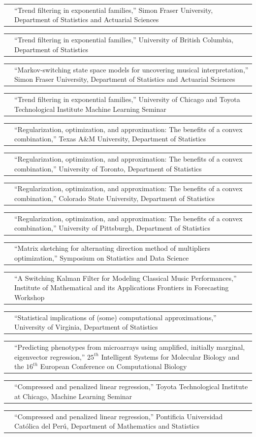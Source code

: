 \documentclass[11pt,letterpaper]{minimal/moderncv}
\makeatletter
\renewcommand*{\cvitem}[2]{%
  \begin{tabular}{@{}p{\hintscolumnwidth}@{\hspace{\separatorcolumnwidth}}%
    p{\maincolumnwidth}@{}}%
    \raggedleft {#1} &  {#2}%
  \end{tabular}%
}
\makeatother
\begin{document}
\cvitem{}{``Trend filtering in exponential families,'' Simon
  Fraser University, Department of Statistics and Actuarial Sciences}


\cvitem{}{``Trend filtering in exponential families,'' University
  of British Columbia, Department of Statistics}

\cvitem{2019}{``Markov-switching state space models for uncovering
  musical interpretation,'' Simon Fraser University, Department of
  Statistics and Actuarial Sciences}

\cvitem{}{ ``Trend filtering in exponential families,'' University of
  Chicago and Toyota Technological Institute Machine Learning
  Seminar}

\cvitem{}{ ``Regularization, optimization, and approximation: The benefits
  of a convex combination,'' Texas A\&M University, Department of
  Statistics }

\cvitem{}{ ``Regularization, optimization, and approximation: The benefits
  of a convex combination,'' University of Toronto, Department of
  Statistics }

\cvitem{}{ ``Regularization, optimization, and approximation: The benefits
  of a convex combination,'' Colorado State University, Department of
  Statistics }

\cvitem{}{ ``Regularization, optimization, and approximation: The benefits
  of a convex combination,'' University of Pittsburgh, Department of
  Statistics }

\cvitem{2018}{ ``Matrix sketching for alternating direction method of
  multipliers optimization,'' Symposium on Statistics and Data
  Science}

\cvitem{}{``A Switching Kalman Filter for Modeling Classical Music
  Performances,'' Institute of Mathematical and its Applications
  Frontiers in Forecasting Workshop}

\cvitem{}{ ``Statistical implications of (some) computational approximations,'' University of Virginia, Department of
  Statistics}

\cvitem{2017}{ ``Predicting phenotypes from microarrays using amplified,
  initially marginal, eigenvector regression,'' $25^{th}$ Intelligent
  Systems for Molecular Biology and the $16^{th}$ European Conference
  on Computational Biology}

\cvitem{}{ ``Compressed and penalized linear regression,'' Toyota
  Technological Institute at Chicago, Machine Learning Seminar}

\cvitem{}{ ``Compressed and penalized linear regression,'' Pontificia
  Universidad Cat\'olica del Per\'u, Department of 
  Mathematics and Statistics}
\end{document}
